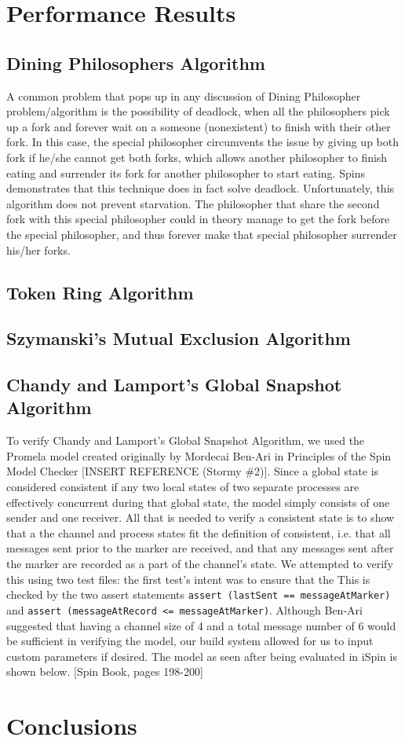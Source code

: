 \documentclass[12pt]{article}
\begin{document}
\begin{flushleft}
\section{Performance Results}
\subsection{Dining Philosophers Algorithm}
A common problem that pops up in any discussion of Dining Philosopher problem/algorithm is the possibility of deadlock, when all the philosophers pick up a fork and forever wait on a someone (nonexistent) to finish with their other fork. In this case, the special philosopher circumvents the issue by giving up both fork if he/she cannot get both forks, which allows another philosopher to finish eating and surrender its fork for another philosopher to start eating. Spins demonstrates that this technique does in fact solve deadlock.
Unfortunately, this algorithm does not prevent starvation. The philosopher that share the second fork with this special philosopher could in theory manage to get the fork before the special philosopher, and thus forever make that special philosopher surrender his/her forks.
\subsection{Token Ring Algorithm}
\subsection{Szymanski's Mutual Exclusion Algorithm}
\subsection{Chandy and Lamport's Global Snapshot Algorithm}
To verify Chandy and Lamport's Global Snapshot Algorithm, we used the Promela model created originally by Mordecai Ben-Ari in Principles of the Spin Model Checker [INSERT REFERENCE (Stormy \#2)]. Since a global state is considered consistent if any two local states of two separate processes are effectively concurrent during that global state, the model simply consists of one sender and one receiver. All that is needed to verify a consistent state is to show that a the channel and process states fit the definition of consistent, i.e. that all messages sent prior to the marker are received, and that any messages sent after the marker are recorded as a part of the channel's state. We attempted to verify this using two test files: the first test's intent was to ensure that the This is checked by the two assert statements \texttt{assert (lastSent == messageAtMarker)} and \texttt{assert (messageAtRecord <= messageAtMarker)}. Although Ben-Ari suggested that having a channel size of 4 and a total message number of 6 would be sufficient in verifying the model, our build system allowed for us to input custom parameters if desired. The model as seen after being evaluated in iSpin is shown below.
[Spin Book, pages 198-200]

\section{Conclusions}

\end{flushleft}
\end{document}
